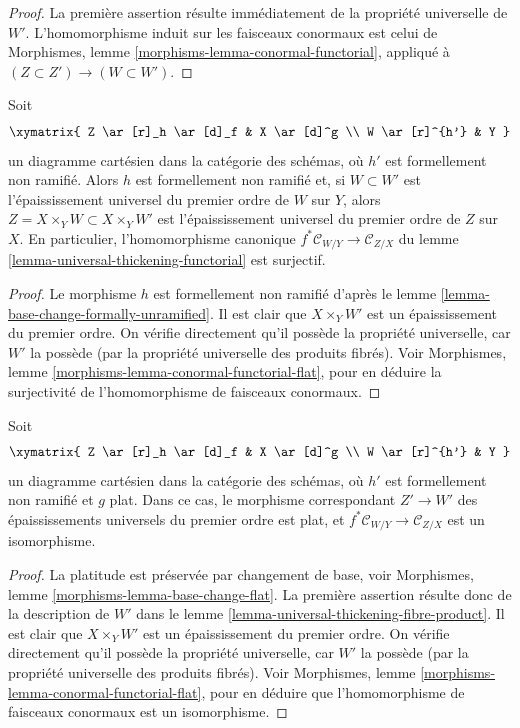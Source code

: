 \begin{proof}
La première assertion résulte immédiatement de la propriété universelle de $W'$.
L'homomorphisme induit sur les faisceaux conormaux est celui de
Morphismes, lemme \ref{morphisms-lemma-conormal-functorial},
appliqué à $(Z \subset Z') \to (W \subset W')$.
\end{proof}

\begin{lemma}
\label{lemma-universal-thickening-fibre-product}
Soit
$$
\xymatrix{
Z \ar[r]_h \ar[d]_f & X \ar[d]^g \\
W \ar[r]^{h'} & Y
}
$$
un diagramme cartésien dans la catégorie des schémas, où
$h'$ est formellement non ramifié. Alors $h$ est formellement non ramifié et, si
$W \subset W'$ est l'épaississement universel du premier ordre de $W$ sur $Y$,
alors $Z = X \times_Y W \subset X \times_Y W'$ est l'épaississement universel
du premier ordre de $Z$ sur $X$. En particulier, l'homomorphisme canonique
$f^*\mathcal{C}_{W/Y} \to \mathcal{C}_{Z/X}$ du
lemme \ref{lemma-universal-thickening-functorial}
est surjectif.
\end{lemma}

\begin{proof}
Le morphisme $h$ est formellement non ramifié d'après
le lemme \ref{lemma-base-change-formally-unramified}.
Il est clair que $X \times_Y W'$ est un épaississement du premier ordre.
On vérifie directement qu'il possède la propriété universelle,
car $W'$ la possède (par la propriété universelle des
produits fibrés). Voir
Morphismes, lemme \ref{morphisms-lemma-conormal-functorial-flat},
pour en déduire la surjectivité de l'homomorphisme de faisceaux conormaux.
\end{proof}

\begin{lemma}
\label{lemma-universal-thickening-fibre-product-flat}
Soit
$$
\xymatrix{
Z \ar[r]_h \ar[d]_f & X \ar[d]^g \\
W \ar[r]^{h'} & Y
}
$$
un diagramme cartésien dans la catégorie des schémas, où
$h'$ est formellement non ramifié et $g$ plat. Dans ce cas, le morphisme
correspondant $Z' \to W'$ des épaississements universels du premier ordre est plat, et
$f^*\mathcal{C}_{W/Y} \to \mathcal{C}_{Z/X}$ est un isomorphisme.
\end{lemma}

\begin{proof}
La platitude est préservée par changement de base, voir
Morphismes, lemme \ref{morphisms-lemma-base-change-flat}.
La première assertion résulte donc de la description de
$W'$ dans le lemme \ref{lemma-universal-thickening-fibre-product}.
Il est clair que $X \times_Y W'$ est un épaississement du premier ordre.
On vérifie directement qu'il possède la propriété universelle,
car $W'$ la possède (par la propriété universelle des
produits fibrés). Voir
Morphismes, lemme \ref{morphisms-lemma-conormal-functorial-flat},
pour en déduire que l'homomorphisme de faisceaux conormaux est un isomorphisme.
\end{proof}

